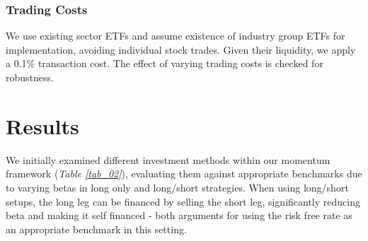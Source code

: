 \documentclass[a4paper,12pt,twoside]{article}
\begin{document}
\subsubsection{Trading Costs}
We use existing sector ETFs and assume existence of industry group ETFs for implementation, avoiding individual stock trades. Given their liquidity, we apply a 0.1\% transaction cost. The effect of varying trading costs is checked for robustness.

\newpage
\section{Results}
We initially examined different investment methods within our  momentum framework (\textit{Table \ref{tab_02}}), evaluating them against appropriate benchmarks due to varying betas in long only and long/short strategies. When using long/short setups, the long leg can be financed by selling the short leg, significantly reducing beta and making it self financed - both arguments for using the risk free rate as an appropriate benchmark in this setting.\\
        
\end{document}
